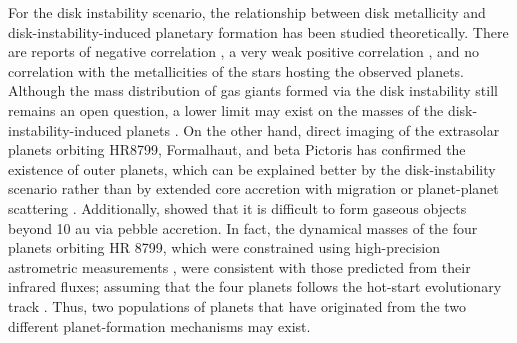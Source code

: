 \documentclass[twocolumn]{aastex62}
\begin{document}
\begin{CJK*}{UTF8}{min}
For the disk instability scenario, the relationship between disk metallicity and disk-instability-induced planetary formation has been studied theoretically. There are reports of negative correlation \citep{2006ApJ...636L.149C, 2007Arizona}, a very weak positive correlation \citep{2007ApJ...661L..77M}, and no correlation \citep{2002ApJ...567L.149B} with the metallicities of the stars hosting the observed planets. Although the mass distribution of gas giants formed via the disk instability still remains an open question, a lower limit may exist on the masses of the disk-instability-induced planets \citep{2007ApJ...662.1282M}. On the other hand, direct imaging of the extrasolar planets orbiting HR8799, Formalhaut, and beta Pictoris \citep{2008Sci...322.1348M, 2008Sci...322.1345K, 2010Sci...329...57L} has confirmed the existence of outer planets, which can be explained better by the disk-instability scenario rather than by extended core accretion with migration or planet-planet scattering \citep{2009ApJ...707...79D}. Additionally, \cite{2016ApJ...825...63C} showed that it is difficult to form gaseous objects beyond 10 au via pebble accretion. In fact, the dynamical masses of the four planets orbiting HR 8799, which were constrained using high-precision astrometric measurements \citep{2018AJ....156..192W}, were consistent with those predicted from their infrared fluxes; assuming that the four planets follows the hot-start evolutionary track \citep{2003A&A...402..701B}. Thus, two populations of planets that have originated from the two different planet-formation mechanisms may exist.


\end{CJK*}
\end{document}
